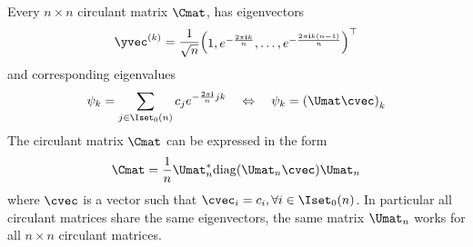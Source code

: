 \begin{theorem} \label{theorem:ch2-diagonalization_circulant_matrix}
  Every $n \times n$ circulant matrix $\Cmat$, has eigenvectors  
  \begin{equation}
    \yvec^{(k)} = \frac{1}{\sqrt{n}} \leftmatrix 1, e^{-\frac{2 \pi \ci k}{n}}, \dots, e^{-\frac{2 \pi \ci k(n-1)}{n}} \rightmatrix^\top
  \end{equation}
  and corresponding eigenvalues
  \begin{equation}
    \psi_k = \sum_{j \in \Iset_0(n)} c_j e^{-\frac{2 \pi \ci}{n} jk} \quad \Leftrightarrow \quad \psi_k = \left( \Umat \cvec \right)_k
  \end{equation}
  The circulant matrix $\Cmat$ can be expressed in the form 
  \begin{equation} \label{equation:ch2-diagonalization_circulant_matrix}
    \Cmat = \frac{1}{n} \Umat_n^* \diag(\Umat_n \cvec) \Umat_n
  \end{equation}
  where $\cvec$ is a vector such that $\cvec_i = c_i, \forall i \in \Iset_0(n)$.
  In particular all circulant matrices share the same eigenvectors, the same matrix $\Umat_n$ works for all $n \times n$ circulant matrices.
\end{theorem}


\begingroup
\allowdisplaybreaks

